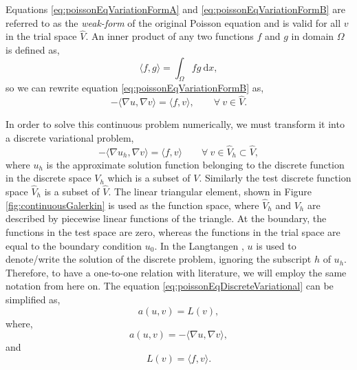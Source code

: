 Equations \ref{eq:poissonEqVariationFormA} and \ref{eq:poissonEqVariationFormB} are referred to as the \textit{weak-form} of the original Poisson equation and is valid for all $v$ in the trial space $\hat{V}$. An inner product of any two functions $f$ and $g$ in domain $\Omega$ is defined as,
	\begin{equation}
	\langle f,g \rangle = \int_{\Omega}fg\ \mathrm{d}x,
	\label{eq:innerProductRule}
	\end{equation}
so we can rewrite equation \ref{eq:poissonEqVariationFormB} as,
	\begin{equation}
	-\langle \nabla u,\nabla v \rangle = \langle f,v \rangle, \qquad \forall\ v \in \hat{V}.
	\end{equation}

In order to solve this continuous problem numerically, we must transform it into a discrete variational problem,
	\begin{equation}
	-\langle \nabla u_h, \nabla v \rangle = \langle f, v \rangle \qquad \forall\ v \in \hat{V}_h \subset \hat{V},
	\label{eq:poissonEqDiscreteVariational}
	\end{equation}
where $u_h$ is the approximate solution function belonging to the discrete function in the discrete space $V_h$ which is a subset of $V$. Similarly the test discrete function space $\hat{V}_h$ is a subset of $\hat{V}$. The linear triangular element, shown in Figure \ref{fig:continuousGalerkin} is used as the function space, where $\hat{V}_h$ and $V_h$ are described by piecewise linear functions of the triangle. At the boundary, the functions in the test space are zero, whereas the functions in the trial space are equal to the boundary condition $u_0$. In the Langtangen \cite{Logg2012b}, $u$ is used to denote/write the solution of the discrete problem, ignoring the subscript $h$ of $u_h$. Therefore, to have a one-to-one relation with literature, we will employ the same notation from here on. The equation \ref{eq:poissonEqDiscreteVariational} can be simplified as,
	\begin{equation}
	a\left(u,v\right) = L(v),
	\label{eq:weakForm}
	\end{equation}
where,
	\begin{equation}
	a\left(u,v\right) = - \langle \nabla u, \nabla v \rangle,
	\end{equation}
and
	\begin{equation}
	L(v) = \langle f,v \rangle.
	\end{equation}

